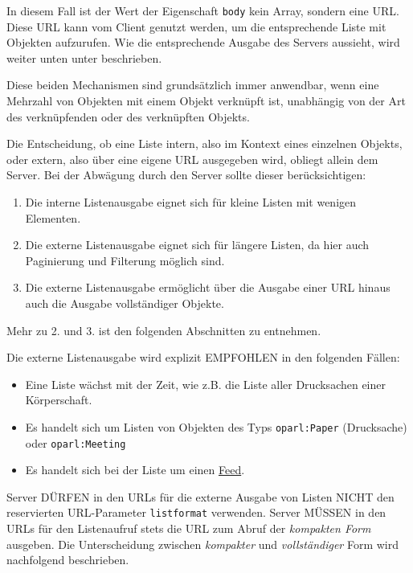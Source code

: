 \documentclass[,a4paper]{article}
\begin{document}
In diesem Fall ist der Wert der Eigenschaft \texttt{body} kein Array,
sondern eine URL. Diese URL kann vom Client genutzt werden, um die
entsprechende Liste mit Objekten aufzurufen. Wie die entsprechende
Ausgabe des Servers aussieht, wird weiter unten unter beschrieben.

Diese beiden Mechanismen sind grundsätzlich immer anwendbar, wenn eine
Mehrzahl von Objekten mit einem Objekt verknüpft ist, unabhängig von der
Art des verknüpfenden oder des verknüpften Objekts.

Die Entscheidung, ob eine Liste intern, also im Kontext eines einzelnen
Objekts, oder extern, also über eine eigene URL ausgegeben wird, obliegt
allein dem Server. Bei der Abwägung durch den Server sollte dieser
berücksichtigen:

\begin{enumerate}
\def\labelenumi{\arabic{enumi}.}
\item
  Die interne Listenausgabe eignet sich für kleine Listen mit wenigen
  Elementen.
\item
  Die externe Listenausgabe eignet sich für längere Listen, da hier auch
  Paginierung und Filterung möglich sind.
\item
  Die externe Listenausgabe ermöglicht über die Ausgabe einer URL hinaus
  auch die Ausgabe vollständiger Objekte.
\end{enumerate}

Mehr zu 2. und 3. ist den folgenden Abschnitten zu entnehmen.

Die externe Listenausgabe wird explizit EMPFOHLEN in den folgenden
Fällen:

\begin{itemize}
\item
  Eine Liste wächst mit der Zeit, wie z.B. die Liste aller Drucksachen
  einer Körperschaft.
\item
  Es handelt sich um Listen von Objekten des Typs \texttt{oparl:Paper}
  (Drucksache) oder \texttt{oparl:Meeting}
\item
  Es handelt sich bei der Liste um einen \hyperref[feeds]{Feed}.
\end{itemize}

Server DÜRFEN in den URLs für die externe Ausgabe von Listen NICHT den
reservierten URL-Parameter \texttt{listformat} verwenden. Server MÜSSEN
in den URLs für den Listenaufruf stets die URL zum Abruf der
\emph{kompakten Form} ausgeben. Die Unterscheidung zwischen
\emph{kompakter} und \emph{vollständiger} Form wird nachfolgend
beschrieben.
\end{document}
